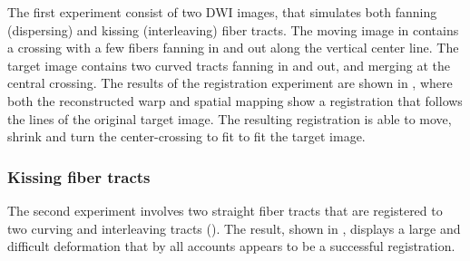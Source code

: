 \documentclass[twocolumn]{svjour3}
\begin{document}
The first experiment consist of two DWI images, that simulates both fanning (dispersing)
and kissing (interleaving) fiber tracts. The moving image in
 contains a crossing with a few fibers fanning in and
out along the vertical center line. The target image contains two curved tracts fanning in
and out, and merging at the central crossing. The results of the registration experiment
are shown in , where both the
reconstructed warp and spatial mapping show a registration that follows the lines of the
original target image. The resulting registration is able to move, shrink and turn the
center-crossing to fit to fit the target image.

\subsubsection{Kissing fiber tracts}

The second experiment involves two straight fiber tracts that are registered to two
curving and interleaving tracts ().  The
result, shown in , displays
a large and difficult deformation that by all accounts appears to be a successful
registration.
\end{document}
